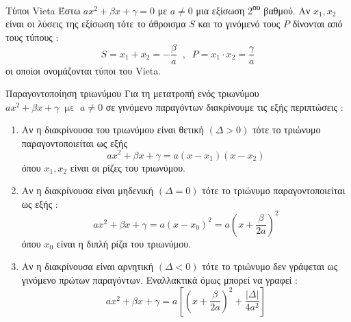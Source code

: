 \begin{thewrhma}{Τύποι Vieta}
Έστω $ ax^2+\beta x+\gamma=0 $ με $ a\neq0 $ μια εξίσωση 2\textsuperscript{ου} βαθμού. Αν $ x_1,x_2 $ είναι οι λύσεις της εξίσωση τότε το άθροισμα $ S $ και το γινόμενό τους $ P $ δίνονται από τους τύπους :
\[ S=x_1+x_2=-\dfrac{\beta}{a}\;\;,\;\;P=x_1\cdot x_2=\dfrac{\gamma}{a} \]
οι οποίοι ονομάζονται τύποι του Vieta.
\end{thewrhma}
\begin{thewrhma}{Παραγοντοποίηση τριωνύμου}
Για τη μετατροπή ενός τριωνύμου $ ax^2+\beta x+\gamma\;\;\textrm{με}\;\;a\neq0 $ σε γινόμενο παραγόντων διακρίνουμε τις εξής περιπτώσεις :
\begin{enumerate}[itemsep=0mm]
\item Αν η διακρίνουσα του τριωνύμου είναι θετική $\left( \varDelta>0\right)  $ τότε το τριώνυμο παραγοντοποιείται ως εξής \[ ax^2+\beta x+\gamma=a(x-x_1)(x-x_2) \]
όπου $ x_1,x_2 $ είναι οι ρίζες του τριωνύμου.
\item Αν η διακρίνουσα είναι μηδενική $\left( \varDelta=0\right)  $ τότε το τριώνυμο παραγοντοποιείται ως εξής : \[ ax^2+\beta x+\gamma=a\left(x-x_0\right)^2=a\left(x+\frac{\beta}{2a}\right)^2  \]
όπου $ x_0 $ είναι η διπλή ρίζα του τριωνύμου.
\item Αν η διακρίνουσα είναι αρνητική $\left( \varDelta<0\right)  $ τότε το τριώνυμο δεν γράφεται ως γινόμενο πρώτων παραγόντων. Εναλλακτικά όμως μπορεί να γραφεί : \[ ax^2+\beta x+\gamma=a\left[\left(x+\frac{\beta}{2a}\right)^2+\frac{|\varDelta|}{4a^2}\right]  \]
\end{enumerate}
\end{thewrhma}
